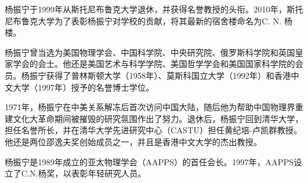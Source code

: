 杨振宁于1999年从斯托尼布鲁克大学退休，并获得名誉教授的头衔。2010年，斯托尼布鲁克大学为了表彰杨振宁对学校的贡献，将其最新的宿舍楼命名为C. N. 杨楼。

杨振宁曾当选为美国物理学会、中国科学院、中央研究院、俄罗斯科学院和英国皇家学会的会士。他还是美国艺术与科学学院、美国哲学学会和美国国家科学院的会员。杨振宁获得了普林斯顿大学（1958年）、莫斯科国立大学（1992年）和香港中文大学（1997年）授予的名誉博士学位。

1971年，杨振宁在中美关系解冻后首次访问中国大陆，随后他为帮助中国物理界重建文化大革命期间被摧毁的研究氛围作出了努力。退休后，杨振宁回到清华大学，担任名誉所长，并在清华大学先进研究中心（CASTU）担任黄纪培-卢凯群教授。他还是两位邵逸夫奖创始成员之一，并且是香港中文大学的杰出教授。

杨振宁是1989年成立的亚太物理学会（AAPPS）的首任会长。1997年，AAPPS设立了C.N.杨奖，以表彰年轻研究人员。